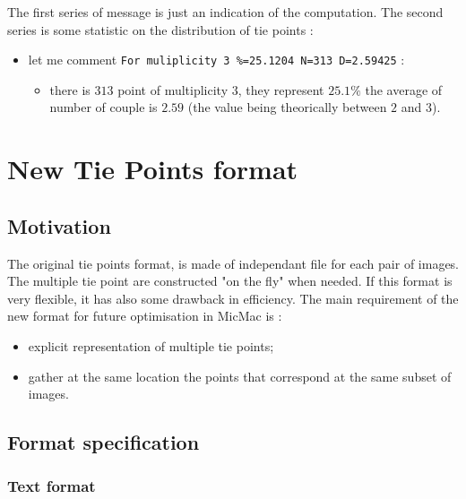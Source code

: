 The first series of message is just an indication of the computation. The second
series is some statistic on the distribution of tie points  :

\begin{itemize}
   \item let me comment {\tt For muliplicity 3 \%=25.1204 N=313 D=2.59425} :
   \begin{itemize}
   \item there is $313$ point of multiplicity $3$, they represent $25.1\%$ the average
         of number of couple is $2.59$ (the value being theorically between $2$ and $3$).
   \end{itemize}
   
\end{itemize}



\section{New Tie Points format}


\subsection{Motivation}

The original tie points format, is made of independant file for each pair of images.
The multiple tie point are constructed "on the fly" when needed.  If this format 
is very flexible, it has also some drawback in efficiency. The main requirement of
the new format for future optimisation in MicMac is :

\begin{itemize}
   \item  explicit representation of multiple tie points;
   \item  gather at the same location the points that correspond at the same subset of images.
\end{itemize}


\subsection{Format specification}


\subsubsection{Text format}

